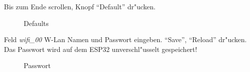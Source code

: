 \documentclass[ngerman,11pt,parskip=half] {scrartcl}
\begin{document}
Bis zum Ende scrollen, Knopf "`Default"' dr"ucken.

\begin{figure}[H]
\centering
{}
\caption{Defaults} \label{fig:1}
\end{figure}

Feld \emph{wifi\_00} W-Lan Namen und Passwort eingeben. "`Save"', "`Reload"' dr"ucken. Das Passwort wird auf dem ESP32 unverschl"usselt gespeichert!

\begin{figure}[H]
\centering
{}
\caption{Passwort} \label{fig:1}
\end{figure}
\end{document}
